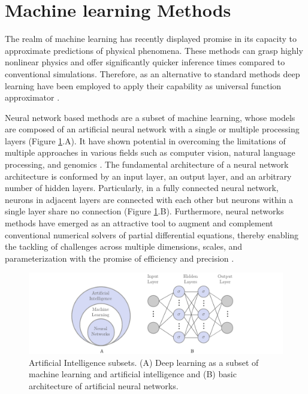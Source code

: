 \documentclass[11pt,twoside]{article}
\begin{document}
\section{Machine learning Methods}\label{sec:machine_learning_methods}

The realm of machine learning has recently displayed promise in its capacity to approximate predictions of physical phenomena. 
These methods can grasp highly nonlinear physics and offer significantly quicker inference times compared to conventional 
simulations. Therefore, as an alternative to standard methods deep learning have been employed to apply their capability as 
universal function approximator \citep{hornik_approximation_1991}.

Neural network based methods are a subset of machine learning, whose models are composed of an artificial neural network with a single 
or multiple processing layers (Figure \ref{deep_learning_subset_architecture}.A). It have shown potential in overcoming the limitations 
of multiple approaches in various fields such as computer vision, natural language processing, and genomics 
\citep{lecun_deep_2015,goodfellow_deep_2016}. The fundamental architecture of a neural network architecture is conformed by an input 
layer, an output layer, and an arbitrary number of hidden layers. Particularly, in a fully connected neural network, neurons in adjacent 
layers are connected with each other but neurons within a single layer share no connection (Figure \ref{deep_learning_subset_architecture}.B). 
Furthermore, neural networks methods have emerged as an attractive tool to augment and complement conventional numerical solvers of partial 
differential equations, thereby enabling the tackling of challenges across multiple dimensions, scales, and parameterization with the promise 
of efficiency and precision \citep{blechschmidt_three_2021}. 

\begin{figure}[H]
\centering
    \includegraphics[width=1.0\textwidth]{figs/artificial_intelligence_subsets.pdf}
    \caption{Artificial Intelligence subsets. (A) Deep learning as a subset of machine learning and artificial intelligence and (B) basic 
    architecture of artificial neural networks.}    
    \label{deep_learning_subset_architecture}
\end{figure}
\end{document}

